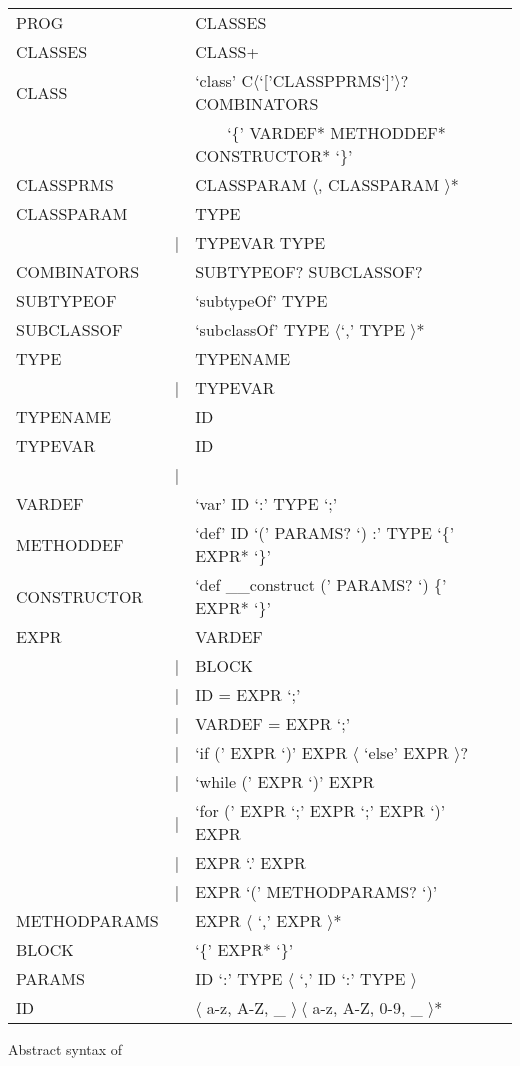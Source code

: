 \begin{listing}
	\begin{tabular}[H]{lrll}
		PROG & \lra & CLASSES \\
		CLASSES & \lra & CLASS+ \\
		CLASS & \lra & `class' C$\langle$`['CLASSPPRMS`]'$\rangle$? COMBINATORS \\
		& & ~~~~`\{' VARDEF* METHODDEF* CONSTRUCTOR* `\}' \\
		CLASSPRMS & \lra & CLASSPARAM $\langle$, CLASSPARAM $\rangle$* \\
		CLASSPARAM & \lra & TYPE \\
		 & | & TYPEVAR \match TYPE \\
		COMBINATORS & \lra & SUBTYPEOF? SUBCLASSOF? \\
		SUBTYPEOF & \lra & `subtypeOf' TYPE \\
		SUBCLASSOF & \lra & `subclassOf' TYPE $\langle$`,' TYPE $\rangle$* \\
		TYPE & \lra & TYPENAME \\
		& | & TYPEVAR \\
		TYPENAME & \lra & ID \\
		TYPEVAR & \lra & ID \\
		& | & \mytype \\
		VARDEF & \lra & `var' ID `:' TYPE `;' \\
		METHODDEF & \lra & `def' ID `(' PARAMS? `) :' TYPE `\{' EXPR* `\}'  \\
		CONSTRUCTOR & \lra & `def \_\_construct (' PARAMS? `) \{' EXPR* `\}' \\
		EXPR & \lra & VARDEF \\
		& | & BLOCK \\
		& | & ID = EXPR `;' \\
		& | & VARDEF = EXPR `;' \\
		& | & `if (' EXPR `)' EXPR $\langle$ `else' EXPR $\rangle$?  \\
		& | & `while (' EXPR `)' EXPR \\
		& | & `for (' EXPR `;' EXPR `;' EXPR `)' EXPR \\
		& | & EXPR `.' EXPR \\
		& | & EXPR `(' METHODPARAMS? `)' \\
		METHODPARAMS & \lra & EXPR $\langle$ `,' EXPR $\rangle$* \\
		BLOCK & \lra & `\{' EXPR* `\}' \\
		PARAMS & \lra & ID `:' TYPE $\langle$ `,' ID `:' TYPE $\rangle$ \\
		ID & \lra & $\langle$ a-z, A-Z, \_ $\rangle~\langle$ a-z, A-Z, 0-9, \_ $\rangle$* \\
	\end{tabular}
	\caption{Abstract syntax of \ooplss}
	\label{lst:abstractSyntax}
\end{listing}

